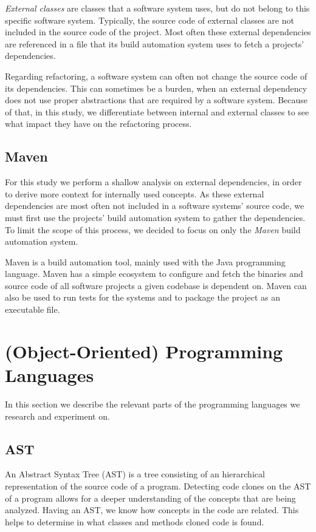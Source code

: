 \textit{External classes} are classes that a software system uses, but do not belong to this specific software system. Typically, the source code of external classes are not included in the source code of the project. Most often these external dependencies are referenced in a file that its build automation system uses to fetch a projects' dependencies.

Regarding refactoring, a software system can often not change the source code of its dependencies. This can sometimes be a burden, when an external dependency does not use proper abstractions that are required by a software system. Because of that, in this study, we differentiate between internal and external classes to see what impact they have on the refactoring process.

\subsection{Maven}
For this study we perform a shallow analysis on external dependencies, in order to derive more context for internally used concepts. As these external dependencies are most often not included in a software systems' source code, we must first use the projects' build automation system to gather the dependencies. To limit the scope of this process, we decided to focus on only the \textit{Maven} build automation system.

Maven is a build automation tool, mainly used with the Java programming language. Maven has a simple ecosystem to configure and fetch the binaries and source code of all software projects a given codebase is dependent on. Maven can also be used to run tests for the systems and to package the project as an executable file.

\section{(Object-Oriented) Programming Languages}
In this section we describe the relevant parts of the programming languages we research and experiment on.

\subsection{AST} \label{sec:astbackground}
An Abstract Syntax Tree (AST) is a tree consisting of an hierarchical representation of the source code of a program. Detecting code clones on the AST of a program allows for a deeper understanding of the concepts that are being analyzed. Having an AST, we know how concepts in the code are related. This helps to determine in what classes and methods cloned code is found.

